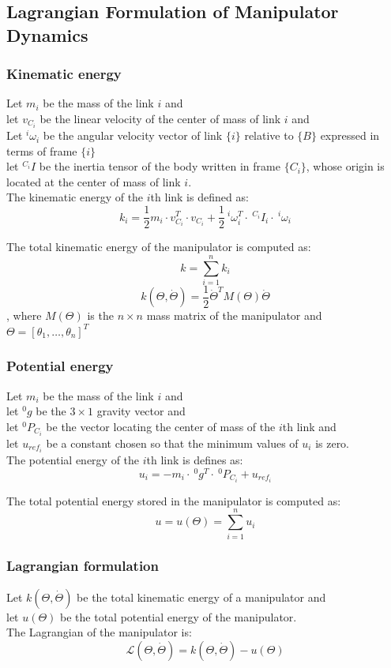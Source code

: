 \documentclass[10pt,a4paper]{article}
\begin{document}
\subsection{Lagrangian Formulation of Manipulator Dynamics}
\subsubsection{Kinematic energy}
Let $m_i$ be the mass of the link $i$ and \\
let $v_{C_i}$ be the linear velocity of the center of mass of link $i$ and \\
Let $^i\omega_i$ be the angular velocity vector of link $\{i\}$ relative to $\{B\}$ expressed in terms of frame $\{i\}$ \\
let $^{C_i}I$ be the inertia tensor of the body written in frame $\{C_i\}$, whose origin is located at the center of mass of link $i$. \\
The kinematic energy of the $i$th link is defined as:
$$
	k_i = \frac 1 2 m_i ⋅ v_{C_i}^T ⋅ v_{C_i} + \frac 1 2 ~^i\omega_i^T ⋅ ~^{C_i}I_i ⋅ ~^i\omega_i
$$

The total kinematic energy of the manipulator is computed as:
$$
	k = \sum_{i = 1}^n k_i
$$
$$
	k(\Theta, \dot \Theta) = \frac 1 2 \dot \Theta^T M(\Theta)\dot \Theta
$$
, where $M(\Theta)$ is the $n \times n$ mass matrix of the manipulator and $\Theta = [\theta_1, \dots, \theta_n]^T$

\subsubsection{Potential energy}
Let $m_i$ be the mass of the link $i$ and \\
let $^0g$ be the $3 \times 1$ gravity vector and \\
let $^0P_{C_i}$ be the vector locating the center of mass of the $i$th link and \\
let $u_{ref_i}$ be a constant chosen so that the minimum values of $u_i$ is zero. \\
The potential energy of the $i$th link is defines as:
$$
	u_i = -m_i ⋅ ~^0g^T ⋅ ~^0P_{C_i} + u_{ref_i}
$$

The total potential energy stored in the manipulator is computed as:
$$
	u = u(\Theta) = \sum_{i = 1}^n u_i
$$

\subsubsection{Lagrangian formulation}
Let $k(\Theta, \dot \Theta)$ be the total kinematic energy of a manipulator and \\
let $u(\Theta)$ be the total potential energy of the manipulator. \\
The Lagrangian of the manipulator is:
$$
	\mathcal{L}(\Theta, \dot \Theta) = k(\Theta, \dot \Theta) - u(\Theta)
$$
\end{document}
